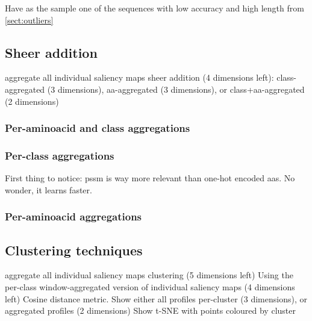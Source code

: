 	Have as the sample one of the sequences with low accuracy and high length from \ref{sect:outliers}

	\subsection{Sheer addition} \label{sect:sheer}
	aggregate all individual saliency maps %
	sheer addition (4 dimensions left): class-aggregated (3 dimensions), aa-aggregated (3 dimensions), or class+aa-aggregated (2 dimensions)
		\subsubsection{Per-aminoacid and class aggregations}
		
		\subsubsection{Per-class aggregations}
		First thing to notice: pssm is way more relevant than one-hot encoded aas. No wonder, it learns faster.

		\subsubsection{Per-aminoacid aggregations}

	\subsection{Clustering techniques}
	aggregate all individual saliency maps %
	clustering (5 dimensions left)
	Using the per-class window-aggregated version of individual saliency maps (4 dimensions left)
	Cosine distance metric.
	Show either all profiles per-cluster (3 dimensions), or aggregated profiles (2 dimensions)
	Show t-SNE with points coloured by cluster
